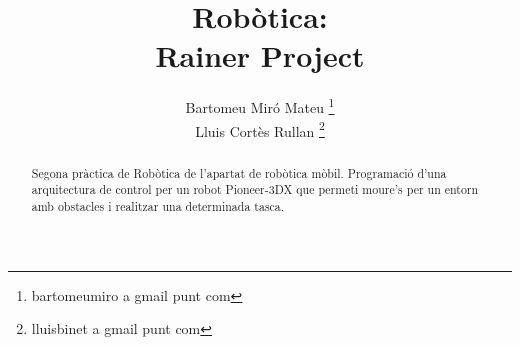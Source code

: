 \documentclass[a4paper,11pt]{scrartcl}
\title{Robòtica: \\ Rainer Project}
\author{ Bartomeu Miró Mateu \thanks{bartomeumiro a gmail punt com} \\
	 Lluis Cortès Rullan \thanks{lluisbinet a gmail punt com} }
\begin{document}
  \maketitle

  \begin{abstract}
    Segona pràctica de Robòtica de l'apartat de robòtica mòbil.
    Programació d'una arquitectura de control per un robot Pioneer-3DX que
    permeti moure’s per un entorn amb obstacles i realitzar una determinada
    tasca.
  \end{abstract}

  \newpage
  \setcounter{page}{2}
  \tableofcontents
  \newpage

  
  
  
  
  
  
\end{document}

